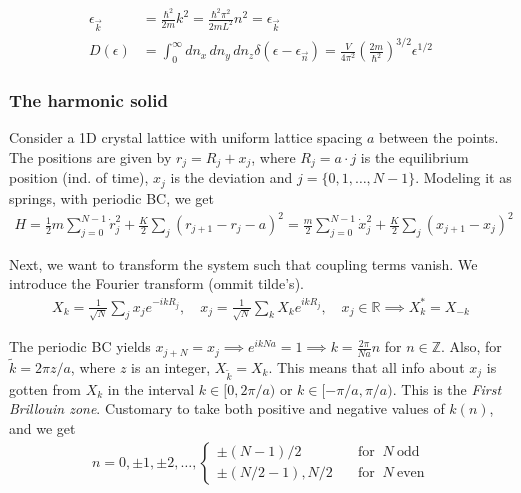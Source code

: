 \documentclass[a4paper, english, 12pt]{article}
\newcommand{\curly}[1]{\{ #1 \} }
\begin{document}
\begin{multicols*}{2}
\begin{align*}
    \epsilon_{\vec{k}} &= \frac{\hbar^2 }{2m}k^2 = \frac{\hbar^2 \pi^2}{2mL^2}n^2 = \epsilon_{\vec{k}} \\ 
    D(\epsilon) &= \int_0^\infty dn_x\,dn_y\,dn_z \delta(\epsilon-\epsilon_{\vec{n}}) = \frac{V}{4\pi^2} \left(\frac{2m}{\hbar^2}\right)^{3/2} \epsilon^{1/2}
\end{align*}


\subsubsection*{The harmonic solid}
Consider a 1D crystal lattice with uniform lattice spacing $a$ between the points. The positions are given by $r_j = R_j + x_j$, where $R_j=a\cdot j$ is the equilibrium position (ind. of time), $x_j$ is the deviation and $j=\curly{0,1,\dots,N-1}$. Modeling it as springs, with periodic BC, we get 
\begin{align*}
    H = \frac{1}{2} m \sum_{j=0}^{N-1} \dot{r}_j^2 + \frac{K}{2} \sum_j (r_{j+1} - r_j - a)^2 = \frac{m}{2}\sum_{j=0}^{N-1} \dot{x}_j^2 + \frac{K}{2} \sum_j (x_{j+1}-x_j)^2
\end{align*}

Next, we want to transform the system such that coupling terms vanish. We introduce the Fourier transform (ommit tilde's).
\begin{align*}
    X_k = \frac{1}{\sqrt{N}} \sum_j x_j e^{-ikR_j},\quad x_j = \frac{1}{\sqrt{N}} \sum_k X_k e^{ikR_j},\quad x_j\in\mathbb{R}\implies X_k^* = X_{-k}
\end{align*}

The periodic BC yields $x_{j+N}=x_j\implies e^{ikNa}=1\implies k = \frac{2\pi}{Na}n$ for $n\in\mathbb{Z}$. Also, for $\tilde{k}=2\pi z/a$, where $z$ is an integer, $X_{\tilde{k}}=X_k$. This means that all info about $x_j$ is gotten from $X_k$ in the interval $k\in[0,2\pi/a)$ or $k\in[-\pi/a,\pi/a)$. This is the \textit{First Brillouin zone}. Customary to take both positive and negative values of $k(n)$, and we get 
\begin{align*}
    n = 0,\pm1,\pm2,\dots, \begin{cases}
        \pm(N-1)/2 \quad&\text{for }\: N\: \text{odd} \\ 
        \pm(N/2-1),N/2\quad&\text{for }\: N\: \text{even}
    \end{cases}
\end{align*}



\end{multicols*}
\end{document}
